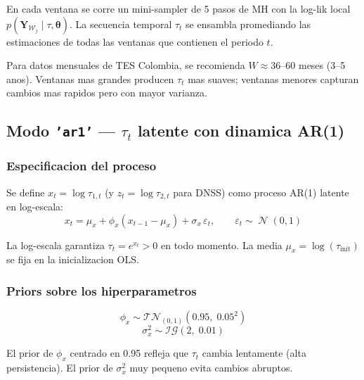 \documentclass[12pt, a4paper]{article}
\theoremstyle{plain}
\theoremstyle{definition}
\theoremstyle{remark}
\newcommand{\bY}{\mathbf{Y}}
\newcommand{\IG}{\mathcal{IG}}
\DeclareMathOperator{\N}{\mathcal{N}}
\newcommand{\TN}{\mathcal{TN}}
\begin{document}
En cada ventana se corre un mini-sampler de 5 pasos de MH con la
log-lik local $p(\bY_{\mathcal{W}_j} \mid \tau, \bm{\theta})$.
La secuencia temporal $\tau_t$ se ensambla promediando las estimaciones
de todas las ventanas que contienen el periodo $t$.

\begin{tipbox}[Eleccion de $W$]
Para datos mensuales de TES Colombia, se recomienda $W \approx 36$--$60$ meses
(3--5 anos). Ventanas mas grandes producen $\tau_t$ mas suaves; ventanas
menores capturan cambios mas rapidos pero con mayor varianza.
\end{tipbox}

\subsection{Modo \texttt{'ar1'} --- $\tau_t$ latente con dinamica AR(1)}

\subsubsection{Especificacion del proceso}

Se define $x_t = \log\tau_{1,t}$ (y $z_t = \log\tau_{2,t}$ para DNSS)
como proceso AR(1) latente en log-escala:
\begin{equation}
  x_t = \mu_x + \phi_x(x_{t-1} - \mu_x) + \sigma_x\,\varepsilon_t, \qquad
  \varepsilon_t \sim \N(0, 1)
  \label{eq:tau_ar1}
\end{equation}

La log-escala garantiza $\tau_t = e^{x_t} > 0$ en todo momento.
La media $\mu_x = \log(\tau_\text{init})$ se fija en la inicializacion OLS.

\subsubsection{Priors sobre los hiperparametros}

\begin{equation}
  \phi_x \sim \TN_{(0,1)}\!\left(0.95,\; 0.05^2\right)
  \label{eq:prior_phi_x}
\end{equation}
\begin{equation}
  \sigma_x^2 \sim \IG\!\left(2,\; 0.01\right)
  \label{eq:prior_sigma_x}
\end{equation}

El prior de $\phi_x$ centrado en 0.95 refleja que $\tau_t$ cambia lentamente
(alta persistencia). El prior de $\sigma_x^2$ muy pequeno evita cambios abruptos.
\end{document}
